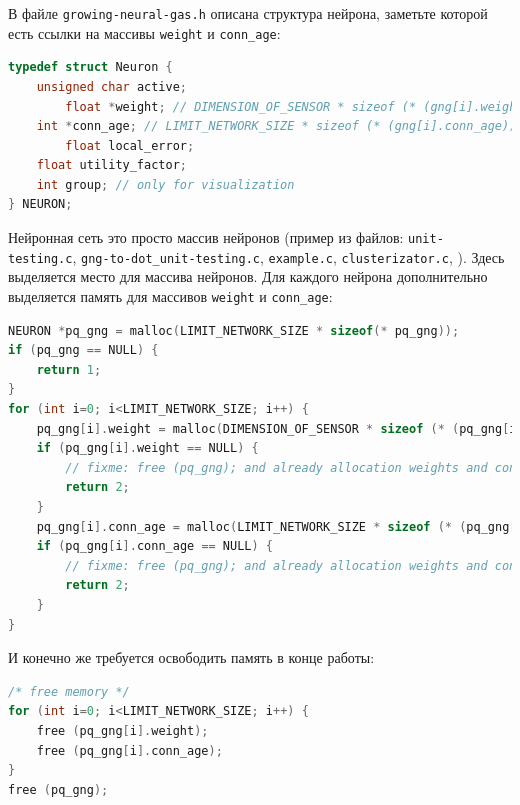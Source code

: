 \documentclass[unicode, 12pt, a4paper,oneside,fleqn]{article}
\begin{document}
В файле \verb'growing-neural-gas.h' описана структура нейрона,
заметьте которой есть ссылки на массивы \verb'weight' и
\verb'conn_age':

\begin{lstlisting}[language=C,
  caption={Описание структуры нейрона},
  captionpos=b,
  label={nueron:code}]
typedef struct Neuron {
	unsigned char active;
        float *weight; // DIMENSION_OF_SENSOR * sizeof (* (gng[i].weight))
	int *conn_age; // LIMIT_NETWORK_SIZE * sizeof (* (gng[i].conn_age))
        float local_error;
	float utility_factor;
	int group; // only for visualization
} NEURON;
\end{lstlisting}


Нейронная сеть это просто массив нейронов (пример из файлов:
\verb'unit-testing.c', \verb'gng-to-dot_unit-testing.c',
\verb'example.c', \verb'clusterizator.c', ).  Здесь выделяется место
для массива нейронов.  Для каждого нейрона дополнительно выделяется
память для массивов \verb'weight' и \verb'conn_age':

\begin{lstlisting}[language=C,
  caption={Выделение памяти},
  captionpos=b,
  label={malloc:code}]
NEURON *pq_gng = malloc(LIMIT_NETWORK_SIZE * sizeof(* pq_gng));
if (pq_gng == NULL) {
	return 1;
}
for (int i=0; i<LIMIT_NETWORK_SIZE; i++) {
	pq_gng[i].weight = malloc(DIMENSION_OF_SENSOR * sizeof (* (pq_gng[i].weight)));
	if (pq_gng[i].weight == NULL) {
		// fixme: free (pq_gng); and already allocation weights and conn_ages
		return 2;
	}
	pq_gng[i].conn_age = malloc(LIMIT_NETWORK_SIZE * sizeof (* (pq_gng[i].conn_age)));
	if (pq_gng[i].conn_age == NULL) {
		// fixme: free (pq_gng); and already allocation weights and conn_ages
		return 2;
	}
}
\end{lstlisting}

И конечно же требуется освободить память в конце работы:
\begin{lstlisting}[language=C,
  caption={Освобождение памяти},
  captionpos=b,
  label={free:code}]
/* free memory */
for (int i=0; i<LIMIT_NETWORK_SIZE; i++) {
	free (pq_gng[i].weight);
	free (pq_gng[i].conn_age);
}
free (pq_gng);
\end{lstlisting}
\end{document}
